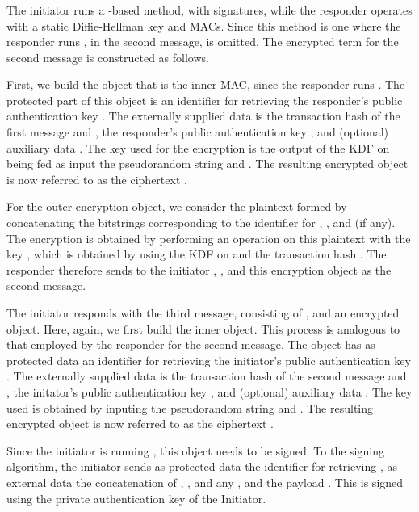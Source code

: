 \subsubsection{\mSigStat}
The initiator runs a \mSigma-based method, with signatures, while the responder operates with a static Diffie-Hellman key and MACs. Since this method is one where the responder runs \mStat, in the second message, \mCi is omitted. The encrypted term for the second message is constructed as follows. 

First, we build the \mCose object that is the inner MAC, since the responder runs \mStat. The protected part of this object is an identifier for retrieving the responder's public authentication key \mCredr. The externally supplied data is the transaction hash \mTHtwo of the first message and \mGy,  the responder's public authentication key \mCredr, and (optional) auxiliary data \mADtwo. The key used for the encryption is the output of the KDF on being fed as input the pseudorandom string \mPRKthree and \mTHtwo. The resulting encrypted object is now referred to as the ciphertext \mMactwo. 

For the outer encryption object, we consider the plaintext formed by concatenating the bitstrings corresponding to the identifier for \mCredr, \mMactwo, and \mADtwo (if any). The encryption is obtained by performing an \mXor operation on this plaintext with the key \mKtwo, which is obtained by using the KDF on \mPRKtwo and the transaction hash \mTHtwo. The responder therefore sends to the initiator \mGy, \mCr, and this \mCose encryption object as the second message.

The initiator responds with the third message, consisting of \mCr, and an encrypted object. Here, again, we first build the inner \mCose object. This process is analogous to that employed by the responder for the second message. The \mCose object has as protected data an identifier for retrieving the initiator's public authentication key \mCredi. The externally supplied data is the transaction hash \mTHthree of the second message and \mTHtwo,  the initator's public authentication key \mCredi, and (optional) auxiliary data \mADthree. The key used is obtained by inputing the pseudorandom string \mPRKfour and \mTHthree. The resulting encrypted object is now referred to as the ciphertext \mMacthree. 

Since the initiator is running \mSig, this \mCose object needs to be signed. To the signing algorithm, the initiator sends as protected data the identifier for retrieving \mCredi, as external data the concatenation of \mTHthree, \mCredi, and any \mADthree, and the payload \mMacthree. This is signed using the private authentication key of the Initiator.  

